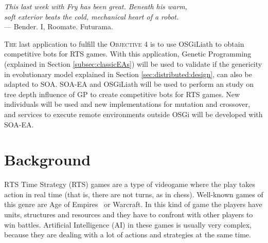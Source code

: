 \label{chap:rts}
\begin{flushright}{\slshape
    This last week with Fry has been great. Beneath his warm,  
    \\soft exterior beats the cold, mechanical heart of a robot. } \\ \medskip
    --- {Bender. I, Roomate. Futurama.}
\end{flushright}
\minitoc\mtcskip
\vfill

\lettrine{T}{he} last application to fulfill the \textsc{Objective 4} is to use OSGiLiath to obtain competitive bots for RTS games. With this application, Genetic Programming (explained in Section \ref{subsec:classicEAs}) will be used to validate if the genericity in evolutionary model explained in Section \ref{sec:distributed:design}, can also be adapted to SOA. SOA-EA and OSGiLiath will be used to perform an study on tree depth influence of GP to create competitive bots for RTS games. New individuals will be used and new implementations for mutation and crossover, and services to execute remote environments outside OSGi will be developed with SOA-EA.


\section{Background}

\lettrine{R}{TS} Time Strategy (RTS) games are a type of videogame
where the play takes action in real time (that is, there are not
turns, as in chess). Well-known games of this genre are Age of
Empires\texttrademark~ or Warcraft\texttrademark. In this kind of game
the players have units, structures and resources and they have to
confront with other players to win battles. Artificial Intelligence
(AI) in these games is usually very complex, because they are dealing
with a lot of actions and strategies at the same time. %

